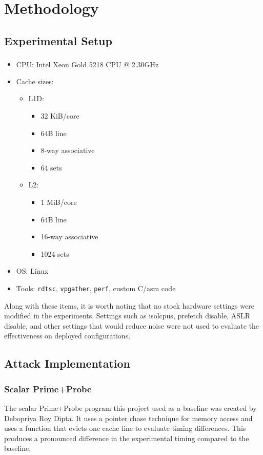 \documentclass[article]{IEEEtran}
\begin{document}
\section{Methodology}

\subsection{Experimental Setup}
\begin{itemize}
    \item CPU: Intel\textsuperscript{\tiny\textregistered} Xeon\textsuperscript{\tiny\textregistered} Gold 5218 CPU @ 2.30GHz
    \item Cache sizes:
    \begin{itemize}
        \item L1D:
        \begin{itemize}
            \item 32 KiB/core
            \item 64B line
            \item 8-way associative
            \item 64 sets
        \end{itemize}
        \item L2:
        \begin{itemize}
            \item 1 MiB/core
            \item 64B line
            \item 16-way associative
            \item 1024 sets
        \end{itemize}
    \end{itemize}
    \item OS: Linux
    \item Tools: \texttt{rdtsc}, \texttt{vpgather}, \texttt{perf}, custom C/asm code
\end{itemize}

Along with these items, it is worth noting that no stock hardware settings were modified in the experiments. Settings such as isolcpus, prefetch disable, ASLR disable, and other settings that would reduce noise were not used to evaluate the effectiveness on deployed configurations.

\subsection{Attack Implementation}

\subsubsection{Scalar Prime+Probe}
The scalar Prime+Probe program this project used as a baseline was created by Debopriya Roy Dipta. It uses a pointer chase technique for memory access and uses a function that evicts one cache line to evaluate timing differences. This produces a pronounced difference in the experimental timing compared to the baseline.
\end{document}
